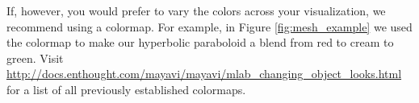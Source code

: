 If, however, you would prefer to vary the colors across your visualization, we recommend using a colormap.
For example, in Figure \ref{fig:mesh_example} we used the colormap  to make our hyperbolic paraboloid a blend from red to cream to green.
Visit \url{http://docs.enthought.com/mayavi/mayavi/mlab_changing_object_looks.html} for a list of all previously established colormaps.

